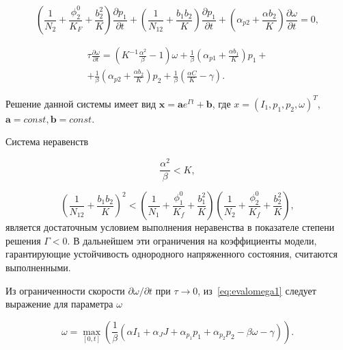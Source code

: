 \begin{equation}
  \label{eq:linequationskelet6}
  \left( \frac{1}{N_2} + \frac{\phi_2^0}{K_F} + \frac{b_2^2}{K} \right) \frac{\partial p_1}{\partial t} + \left( \frac{1}{N_{12}} + \frac{b_1 b_2}{K} \right) \frac{\partial p_1}{\partial t} + \left( \alpha_{p2} + \frac{\alpha b_2}{K} \right) \frac{\partial \omega}{\partial t} = 0,
\end{equation}

\begin{equation}
 \label{eq:linequationskelet7}
   \begin{multlined}
     \tau \frac{\partial \omega}{\partial t} = \left( K^{-1} \frac{\alpha^2}{\beta} - 1 \right) \omega + \frac{1}{\beta} \left( \alpha_{p1} + \frac{\alpha b_1}{K} \right) p_1 +
     \\
     + \frac{1}{\beta} \left( \alpha_{p2} + \frac{\alpha b_2}{K} \right) p_2 + \frac{1}{\beta} \left( \frac{\alpha C}{K} - \gamma \right).
   \end{multlined}
\end{equation}

Решение данной системы имеет вид $\textbf{x} = \textbf{a} e^{\Gamma t } + \textbf{b}$, где $x=(I_1, p_1, p_2, \omega)^T$, $\textbf{a} = const, \textbf{b}=const$.

Система неравенств

\begin{equation}
  \label{eq:neq1}
  \frac{\alpha^2}{\beta} < K,
\end{equation}

\begin{equation}
  \label{eq:neq2}
  \left( \frac{1}{N_{12}} + \frac{b_1 b_2}{K} \right)^2 < \left( \frac{1}{N_1} + \frac{\phi_1^0}{K_f} + \frac{b_1^2}{K} \right) \left( \frac{1}{N_2} + \frac{\phi_2^0}{K_f} + \frac{b_2^2}{K} \right),
\end{equation}
является достаточным условием выполнения неравенства в показателе степени решения $\Gamma < 0$.  В дальнейшем эти ограничения на коэффициенты модели, гарантирующие устойчивость однородного напряженного состояния, считаются выполненными.

Из ограниченности скорости  $\partial \omega / \partial t$ при $\tau \rightarrow 0 $, из~\eqref{eq:evalomega1} следует выражение для параметра $\omega$

\begin{equation}
  \label{eq:omeganext}
  \omega = \max_{[0,t]} \left( \frac{1}{\beta} (\alpha I_1 + \alpha_J J + \alpha_{p_1} p_1 + \alpha_{p_2} p_2 -\beta \omega - \gamma) \right).
\end{equation}

